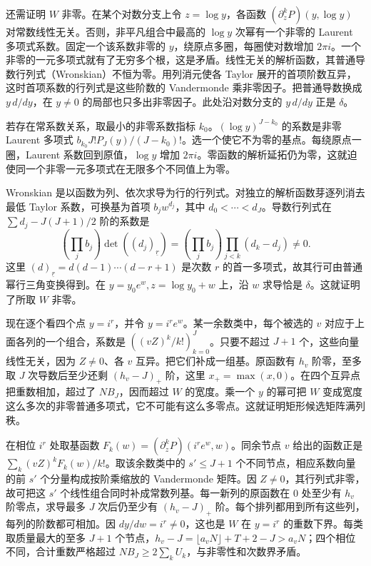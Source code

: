 \documentclass[11pt,a4paper]{article}
\begin{document}
还需证明 \(W\) 非零。在某个对数分支上令 \(z=\log y\)，各函数 \((\partial_z^kP)(y,\log y)\) 对常数线性无关。否则，非平凡组合中最高的 \(\log y\) 次幂有一个非零的 Laurent 多项式系数。固定一个该系数非零的 \(y\)，绕原点多圈，每圈使对数增加 \(2\pi i\)。一个非零的一元多项式就有了无穷多个根，这是矛盾。线性无关的解析函数，其普通导数行列式（Wronskian）不恒为零。用列消元使各 Taylor 展开的首项阶数互异，这时首项系数的行列式是这些阶数的 Vandermonde 乘非零因子。把普通导数换成 \(y\,d/dy\)，在 \(y\ne0\) 的局部也只多出非零因子。此处沿对数分支的 \(y\,d/dy\) 正是 \(\delta\)。

若存在常系数关系，取最小的非零系数指标 \(k_0\)。\((\log y)^{J-k_0}\) 的系数是非零 Laurent 多项式 \(b_{k_0}J!P_J(y)/(J-k_0)!\)。选一个使它不为零的基点。每绕原点一圈，Laurent 系数回到原值，\(\log y\) 增加 \(2\pi i\)。零函数的解析延拓仍为零，这就迫使同一个非零一元多项式在无限多个不同值上为零。

Wronskian 是以函数为列、依次求导为行的行列式。对独立的解析函数芽逐列消去最低 Taylor 系数，可换基为首项 \(b_jw^{d_j}\)，其中 \(d_0<\cdots<d_J\)。导数行列式在 \(\sum d_j-J(J+1)/2\) 阶的系数是 \[
 \left(\prod_j b_j\right)\det((d_j)_{\underline r})
 =\left(\prod_j b_j\right)\prod_{j<k}(d_k-d_j)\ne0 .
\] 这里 \((d)_{\underline r}=d(d-1)\cdots(d-r+1)\) 是次数 \(r\) 的首一多项式，故其行可由普通幂行三角变换得到。在 \(y=y_0e^w,z=\log y_0+w\) 上，沿 \(w\) 求导恰是 \(\delta\)。这就证明了所取 \(W\) 非零。

现在逐个看四个点 \(y=i^r\)，并令 \(y=i^r e^w\)。某一余数类中，每个被选的 \(v\) 对应于上面各列的一个组合，系数是 \(((vZ)^k/k!)_{k=0}^{J}\)。只要不超过 \(J+1\) 个，这些向量线性无关，因为 \(Z\ne0\)、各 \(v\) 互异。把它们补成一组基。原函数有 \(h_v\) 阶零，至多取 \(J\) 次导数后至少还剩 \((h_v-J)_+\) 阶，这里 \(x_+=\max(x,0)\)。在四个互异点把重数相加，超过了 \(NB_J\)，因而超过 \(W\) 的宽度。乘一个 \(y\) 的幂可把 \(W\) 变成宽度这么多次的非零普通多项式，它不可能有这么多零点。这就证明矩形候选矩阵满列秩。

在相位 \(i^r\) 处取基函数 \(F_k(w)=(\partial_z^kP)(i^re^w,w)\)。同余节点 \(v\) 给出的函数正是 \(\sum_k(vZ)^k F_k(w)/k!\)。取该余数类中的 \(s'\le J+1\) 个不同节点，相应系数向量的前 \(s'\) 个分量构成按阶乘缩放的 Vandermonde 矩阵。因 \(Z\ne0\)，其行列式非零，故可把这 \(s'\) 个线性组合同时补成常数列基。每一新列的原函数在 \(0\) 处至少有 \(h_v\) 阶零点，求导最多 \(J\) 次后仍至少有 \((h_v-J)_+\) 阶。每个排列都用到所有这些列，每列的阶数都可相加。因 \(dy/dw=i^r\ne0\)，这也是 \(W\) 在 \(y=i^r\) 的重数下界。每类取质量最大的至多 \(J+1\) 个节点，\(h_v-J=\lfloor a_vN\rfloor+T+2-J>a_vN\)；四个相位不同，合计重数严格超过 \(NB_J\ge2\sum_k U_k\)，与非零性和次数界矛盾。
\end{document}

